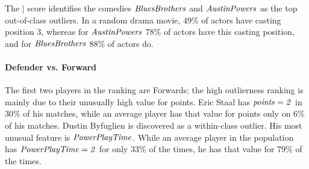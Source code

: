 {							%
							The  $\mid$ score identifies the comedies  $\it{Blues Brothers}$ and $\it{Austin Powers}$ as the top out-of-class outliers. 
							In a random drama movie,  $49\%$ of actors have casting position 3, whereas for $\it{Austin Powers}$ $78\%$ of actors have this casting position, and for $\it{Blues Brothers}$ $88\%$ of actors do. 
     						\paragraph{Defender vs. Forward}
     						The first two players in the ranking are Forwards; the high outlierness ranking is mainly due to their unusually high value for points. Eric Staal has $\it{points=2}$ in 30\% of his matches, while an average player has that value for points only on 6\% of his matches. Dustin Byfuglien is discovered as a within-class outlier. His most unusual feature is $\it{Power Play Time}$. While an average player in the population has  $\it{Power Play Time=2}$ for only 33\% of the times, he has that value for 79\% of the times.
}
